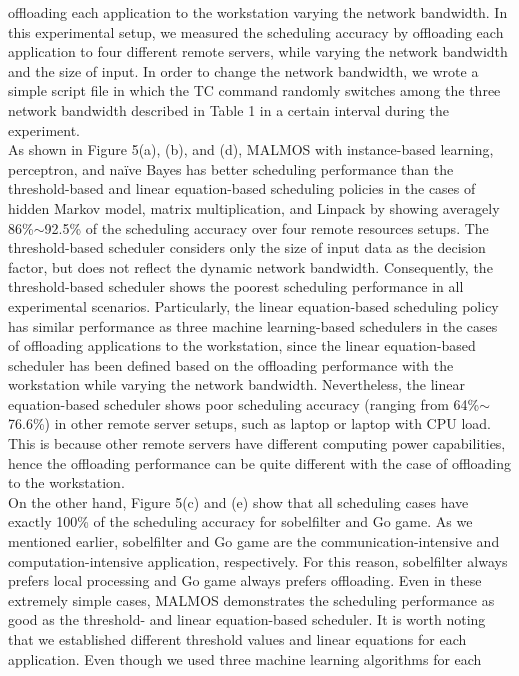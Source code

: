 \documentclass[10pt, conference, compsocconf]{IEEEtran}
\begin{document}
{{offloading each application to the workstation varying the network
bandwidth.
%
In this experimental setup, we measured the scheduling accuracy by
offloading each application to four different remote servers, while
varying the network bandwidth and the size of input.
%
In order to change the network bandwidth, we wrote a simple script file
in which the TC command randomly switches among the three network
bandwidth described in Table 1 in a certain interval during the
experiment.\\
%
\indent As shown in Figure 5(a), (b), and (d), MALMOS with
instance-based learning, perceptron, and na\"{i}ve Bayes has better
scheduling performance than the threshold-based and linear
equation-based scheduling policies in the cases of hidden Markov model,
matrix multiplication, and Linpack by showing averagely 86\%$\sim$92.5\% of the
scheduling accuracy over four remote resources setups.
%
The threshold-based scheduler considers only the
size of input data as the decision factor, but does not reflect the
dynamic network bandwidth.
%
Consequently, the threshold-based scheduler shows the poorest scheduling
performance in all experimental scenarios.
%
Particularly, the linear equation-based scheduling policy has similar
performance as three machine learning-based schedulers in the cases of
offloading applications to the workstation, since the linear
equation-based scheduler has been defined based on the offloading
performance with the workstation while varying the network bandwidth.
%
Nevertheless, the linear equation-based scheduler shows poor
scheduling accuracy (ranging from 64\%$\sim$76.6\%) in other remote server
setups, such as laptop or laptop with CPU load.
%
This is because other remote servers have different computing power
capabilities, hence the offloading performance can be quite different
with the case of offloading to the workstation.\\
%
\indent On the other hand, Figure 5(c) and (e) show that all scheduling
cases have exactly 100\% of the scheduling accuracy for sobelfilter and Go game.
%
As we mentioned earlier, sobelfilter and Go game are the
communication-intensive and computation-intensive application,
respectively.
%
For this reason, sobelfilter always prefers local processing and Go game
always prefers offloading.
%
Even in these extremely simple cases, MALMOS demonstrates the scheduling
performance as good as the threshold- and linear equation-based
scheduler.
%
It is worth noting that we established different threshold values and linear
equations for each application. 
%
Even though we used three machine learning algorithms for each
}}
\end{document}
